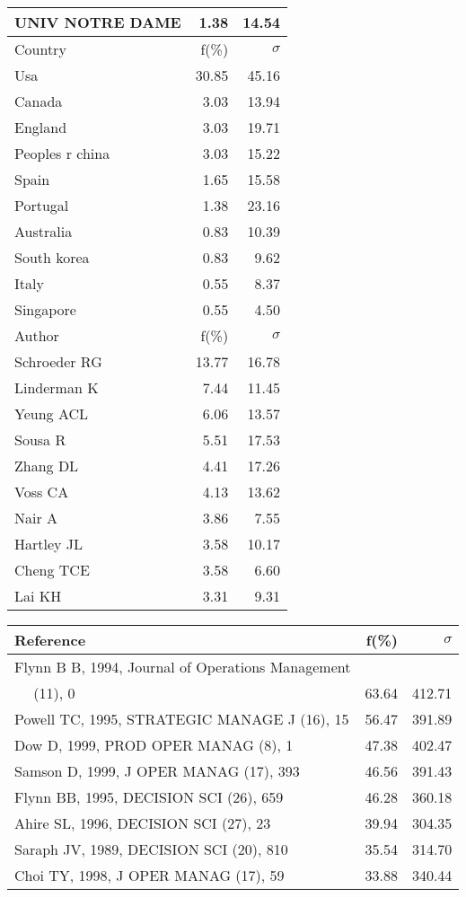 \documentclass[a4paper,11pt]{report}
\begin{document}
\begin{landscape}
\begin{table}[!ht]
{\begin{tabular}{|l r r|}
UNIV NOTRE DAME & 1.38 & 14.54\\
\hline
\hline
Country & f(\%) & $\sigma$\\
\hline
Usa & 30.85 & 45.16\\
Canada & 3.03 & 13.94\\
England & 3.03 & 19.71\\
Peoples r china & 3.03 & 15.22\\
Spain & 1.65 & 15.58\\
Portugal & 1.38 & 23.16\\
Australia & 0.83 & 10.39\\
South korea & 0.83 & 9.62\\
Italy & 0.55 & 8.37\\
Singapore & 0.55 & 4.50\\
\hline
\hline
Author & f(\%) & $\sigma$\\
\hline
Schroeder RG & 13.77 & 16.78\\
Linderman K & 7.44 & 11.45\\
Yeung ACL & 6.06 & 13.57\\
Sousa R & 5.51 & 17.53\\
Zhang DL & 4.41 & 17.26\\
Voss CA & 4.13 & 13.62\\
Nair A & 3.86 & 7.55\\
Hartley JL & 3.58 & 10.17\\
Cheng TCE & 3.58 & 6.60\\
Lai KH & 3.31 & 9.31\\
\hline
\end{tabular}
}
{\scriptsize\begin{tabular}{|l r r|}
\hline
Reference & f(\%) & $\sigma$\\
\hline
Flynn B B, 1994, Journal of Operations Management &  & \\
$\quad$ (11), 0 & 63.64 & 412.71\\
Powell TC, 1995, STRATEGIC MANAGE J (16), 15 & 56.47 & 391.89\\
Dow D, 1999, PROD OPER MANAG (8), 1 & 47.38 & 402.47\\
Samson D, 1999, J OPER MANAG (17), 393 & 46.56 & 391.43\\
Flynn BB, 1995, DECISION SCI (26), 659 & 46.28 & 360.18\\
Ahire SL, 1996, DECISION SCI (27), 23 & 39.94 & 304.35\\
Saraph JV, 1989, DECISION SCI (20), 810 & 35.54 & 314.70\\
Choi TY, 1998, J OPER MANAG (17), 59 & 33.88 & 340.44\\

\end{tabular}}
\end{table}
\end{landscape}
\end{document}
